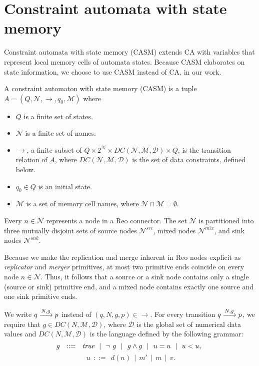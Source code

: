 \section{Constraint automata with state memory}
\label{sec:casm}
Constraint automata with state memory (CASM) \cite{CASMPourvatan2012} extends CA with variables that represent local memory cells of automata states. %
Because CASM elaborates on state information, we choose to use CASM instead of CA, in our work.%
\begin{definition}
 \label{def:casm}
A constraint automaton with state memory (CASM) is a tuple $A = (Q, \mathcal{N}, \rightarrow, q_0, \mathcal{M})$ where
\begin{itemize}%
 \item $Q$ is a finite set of states.
 \item $\mathcal{N}$ is a finite set of names.
 \item $\rightarrow$, a finite subset of $Q \times 2^{\mathcal{N}} \times DC(\mathcal{N}, \mathcal{M}, \mathcal{D}) \times Q$, is the transition relation of $A$,  where $DC(\mathcal{N}, \mathcal{M}, \mathcal{D})$ is the set of data constraints, defined below.
 \item $q_0 \in Q$ is an initial state.
 \item $\mathcal{M}$  is a set of memory cell names, where $\mathcal{N} \cap \mathcal{M} = \emptyset. $
\end{itemize}
\end{definition}

Every $n \in \mathcal{N}$ represents a node in a Reo connector. The set $\mathcal{N}$ is partitioned into three mutually disjoint sets of source nodes $\mathcal{N}^{src}$, mixed nodes $\mathcal{N}^{mix}$, and sink nodes $\mathcal{N}^{snk}$. 

Because we make the replication and merge inherent in Reo nodes explicit as \emph{replicator} and \emph{merger} primitives, at most two primitive ends coincide on every node $n \in \mathcal{N}$. Thus, it follows that a source or a sink node contains only a single (source or sink) primitive end, and a mixed node contains exactly one source and one sink primitive ends.

We write $q\xrightarrow{N,g}p$ instead of $(q, N, g, p) \in \rightarrow$. For every transition $q\xrightarrow{N,g}p$, we require that $g \in DC(N,\mathcal{M}, \mathcal{D})$, where $\mathcal{D}$ is the global set of numerical data values and $DC(N,\mathcal{M}, \mathcal{D})$ is the language defined by the following grammar:
$$\ g \ \ ::=\ \ \emph{true}\ \ |\ \  \neg\ g\ \ |\ \ g \wedge g \ \ |\ \ u = u\ \ |\ \ u < u,\ \  $$
$$\ u \ \ ::=\ \ d(n)\ \ |\ \ m'\ \ |\ \ m\ \ |\ \ v.$$

